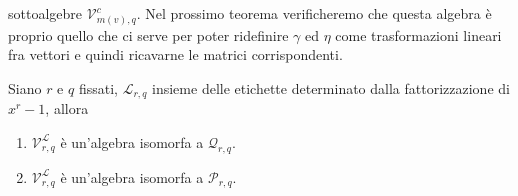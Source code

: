 sottoalgebre $\mathcal{V}_{m(v), q}^{c}$. Nel prossimo teorema verificheremo che questa algebra è proprio quello che ci serve per poter ridefinire $\gamma$ ed $\eta$ come trasformazioni lineari fra vettori e quindi ricavarne le matrici corrispondenti.
\begin{teorema}
   Siano $r$ e $q$ fissati, $\mathscr{L}_{r,q}$ insieme delle etichette determinato dalla fattorizzazione di $x^r-1$, allora
   \begin{enumerate}
      \item $\mathcal{V}_{r,q}^{\mathscr{L}}$ è un'algebra isomorfa a $\mathcal{Q}_{r,q}$.
      \item $\mathcal{V}_{r,q}^{\mathscr{L}}$ è un'algebra isomorfa a $\mathcal{P}_{r,q}$.
   \end{enumerate}
\end{teorema}
